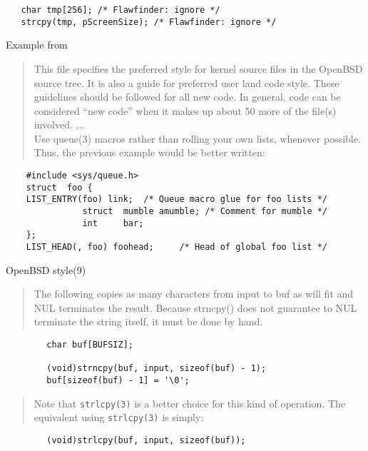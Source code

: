 \documentclass[Screen16to9,17pt]{foils}
\begin{document}
\begin{verbatim}
   char tmp[256]; /* Flawfinder: ignore */
   strcpy(tmp, pScreenSize); /* Flawfinder: ignore */
\end{verbatim}
Example from 



\begin{quote}
This file specifies the preferred style for kernel source files in the
OpenBSD source tree.  It is also a guide for preferred user land code
style.  These guidelines should be followed for all new code.  In general,
code can be considered ``new code'' when it makes up about 50%
more of the file(s) involved. ...\\
Use queue(3) macros rather than rolling your own lists, whenever possible.
Thus, the previous example would be better written:
\end{quote}

\begin{verbatim}
    #include <sys/queue.h>
    struct  foo {
    LIST_ENTRY(foo) link;  /* Queue macro glue for foo lists */
               struct  mumble amumble; /* Comment for mumble */
               int     bar;
    };
    LIST_HEAD(, foo) foohead;     /* Head of global foo list */
\end{verbatim}


OpenBSD style(9)


\begin{quote}
The following copies as many characters from input to buf as will fit and
NUL terminates the result.  Because strncpy() does not guarantee to NUL
terminate the string itself, it must be done by hand.
\end{quote}

\begin{verbatim}
        char buf[BUFSIZ];

        (void)strncpy(buf, input, sizeof(buf) - 1);
        buf[sizeof(buf) - 1] = '\0';
\end{verbatim}

\begin{quote}
Note that \verb+strlcpy(3)+ is a better choice for this kind of operation.  The
equivalent using \verb+strlcpy(3)+ is simply:
\end{quote}
\begin{verbatim}
        (void)strlcpy(buf, input, sizeof(buf));
\end{verbatim}
\end{document}
